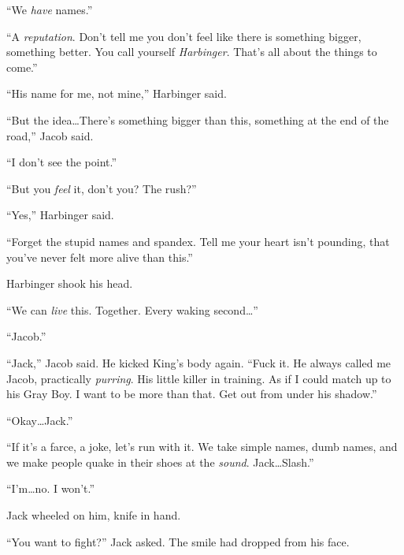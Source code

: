 ``We \emph{have} names.''



``A \emph{reputation}.  Don't tell me you don't feel like there is something bigger, something better.  You call yourself \emph{Harbinger}.  That's all about the things to come.''



``His name for me, not mine,'' Harbinger said.



``But the idea\ldots  There's something bigger than this, something at the end of the road,'' Jacob said.



``I don't see the point.''



``But you \emph{feel} it, don't you?  The rush?''



``Yes,'' Harbinger said.



``Forget the stupid names and spandex.  Tell me your heart isn't pounding, that you've never felt more alive than this.''



Harbinger shook his head.



``We can \emph{live} this.  Together.  Every waking second\ldots''



``Jacob.''



``Jack,'' Jacob said.  He kicked King's body again.  ``Fuck it.  He always called me Jacob, practically \emph{purring}.  His little killer in training.  As if I could match up to his Gray Boy.  I want to be more than that.  Get out from under his shadow.''



``Okay\ldots Jack.''



``If it's a farce, a joke, let's run with it.  We take simple names, dumb names, and we make people quake in their shoes at the \emph{sound}.  Jack\ldots Slash.''



``I'm\ldots no.  I won't.''



Jack wheeled on him, knife in hand.



``You want to fight?'' Jack asked.  The smile had dropped from his face.



